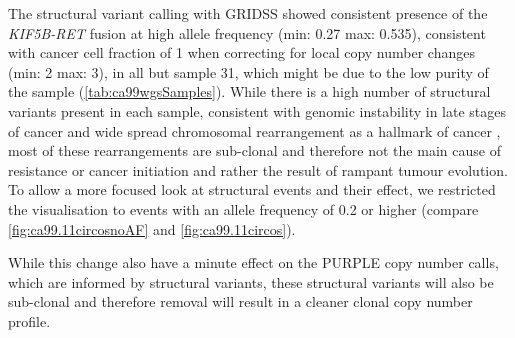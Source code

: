 The structural variant calling with GRIDSS showed consistent presence of the \textit{KIF5B-RET} fusion at high allele frequency (min: 0.27 max: 0.535), consistent with cancer cell fraction of 1 when correcting for local copy number changes  (min: 2 max: 3), in all but sample 31, which might be due to the low purity of the sample (\autoref{tab:ca99wgsSamples}). While there is a high number of structural variants present in each sample, consistent with genomic instability in late stages of cancer \cite{Gerstung2020} and wide spread chromosomal rearrangement as a hallmark of cancer \cite{Hanahan2022}, most of these rearrangements are sub-clonal and therefore not the main cause of resistance or cancer initiation and rather the result of rampant tumour evolution. To allow a more focused look at structural events and their effect, we restricted the visualisation to events with an allele frequency of 0.2 or higher (compare \autoref{fig:ca99.11circosnoAF} and \autoref{fig:ca99.11circos}).

While this change also have a minute effect on the PURPLE copy number calls, which are informed by structural variants, these structural variants will also be sub-clonal and therefore removal will result in a cleaner clonal copy number profile.

